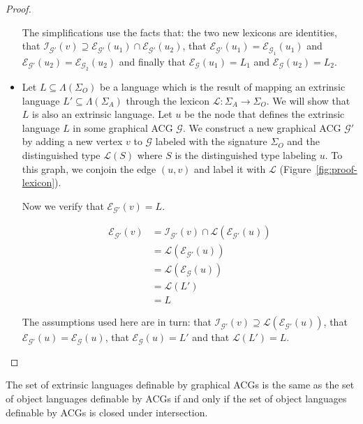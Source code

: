 \begin{proof}
\begin{itemize}
      The simplifications use the facts that: the two new lexicons are
      identities, that $\mathcal{I}_{\mathcal{G}'}(v) \supseteq
      \mathcal{E}_{\mathcal{G}'}(u_1) \cap
      \mathcal{E}_{\mathcal{G}'}(u_2)$, that
      $\mathcal{E}_{\mathcal{G}'}(u_1) =
      \mathcal{E}_{\mathcal{G}_1}(u_1)$ and
      $\mathcal{E}_{\mathcal{G}'}(u_2) =
      \mathcal{E}_{\mathcal{G}_2}(u_2)$ and finally that
      $\mathcal{E}_{\mathcal{G}}(u_1) = L_1$ and
      $\mathcal{E}_{\mathcal{G}}(u_2) = L_2$.

  \item Let $L \subseteq \Lambda(\Sigma_O)$ be a language which is the
    result of mapping an extrinsic language $L' \subseteq
    \Lambda(\Sigma_A)$ through the lexicon $\mathcal{L} : \Sigma_A \to
    \Sigma_O$. We will show that $L$ is also an extrinsic language. Let
    $u$ be the node that defines the extrinsic language $L$ in some
    graphical ACG $\mathcal{G}$. We construct a new graphical ACG
    $\mathcal{G}'$ by adding a new vertex $v$ to $\mathcal{G}$ labeled
    with the signature $\Sigma_O$ and the distinguished type
    $\mathcal{L}(S)$ where $S$ is the distinguished type labeling
    $u$. To this graph, we conjoin the edge $(u,v)$ and label it with
    $\mathcal{L}$ (Figure~\ref{fig:proof-lexicon}).

    Now we verify that $\mathcal{E}_{\mathcal{G}'}(v) = L$.

    \begin{align*}
      \mathcal{E}_{\mathcal{G}'}(v) &= \mathcal{I}_{\mathcal{G}'}(v) \cap
      \mathcal{L}(\mathcal{E}_{\mathcal{G}'}(u)) \\
      &= \mathcal{L}(\mathcal{E}_{\mathcal{G}'}(u)) \\
      &= \mathcal{L}(\mathcal{E}_{\mathcal{G}}(u)) \\
      &= \mathcal{L}(L') \\
      &= L
    \end{align*}

    The assumptions used here are in turn: that
    $\mathcal{I}_{\mathcal{G}'}(v) \supseteq
    \mathcal{L}(\mathcal{E}_{\mathcal{G}'}(u))$, that
    $\mathcal{E}_{\mathcal{G}'}(u) = \mathcal{E}_{\mathcal{G}}(u)$, that
    $\mathcal{E}_{\mathcal{G}}(u) = L'$ and that $\mathcal{L}(L') = L$.
  \end{itemize}
\end{proof}

\begin{corollary}
  The set of extrinsic languages definable by graphical ACGs is the same
  as the set of object languages definable by ACGs if and only if the
  set of object languages definable by ACGs is closed under
  intersection.
\end{corollary}

